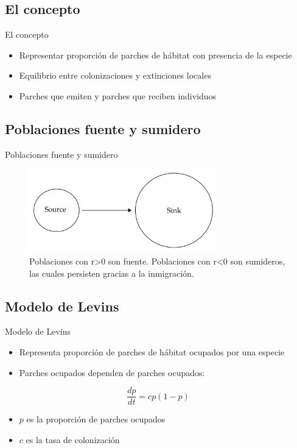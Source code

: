 \documentclass[
  11pt,
  ignorenonframetext,
]{beamer}
\begin{document}
\subsection{El concepto}\label{el-concepto-1}

\begin{frame}{El concepto}
\begin{itemize}
\item
  Representar proporción de parches de hábitat con presencia de la
  especie
\item
  Equilibrio entre colonizaciones y extinciones locales
\item
  Parches que emiten y parches que reciben individuos
\end{itemize}
\end{frame}

\subsection{Poblaciones fuente y
sumidero}\label{poblaciones-fuente-y-sumidero}

\begin{frame}{Poblaciones fuente y sumidero}
\begin{figure}

{\centering \includegraphics[width=3.21in]{Metapoblaciones/Fuente-sumidero} 

}

\caption{Poblaciones con r>0 son fuente. Poblaciones con r<0 son sumideros, las cuales persisten gracias a la inmigración.}\label{fig:unnamed-chunk-5}
\end{figure}
\end{frame}

\subsection{Modelo de Levins}\label{modelo-de-levins}

\begin{frame}{Modelo de Levins}
\begin{itemize}
\item
  Representa proporción de parches de hábitat ocupados por una especie
\item
  Parches ocupados dependen de parches ocupados:
\end{itemize}

\[\frac{dp}{dt} = cp(1-p)\]

\begin{itemize}
\item
  \(p\) es la proporción de parches ocupados
\item
  \(c\) es la tasa de colonización
\end{itemize}
\end{frame}
\end{document}
